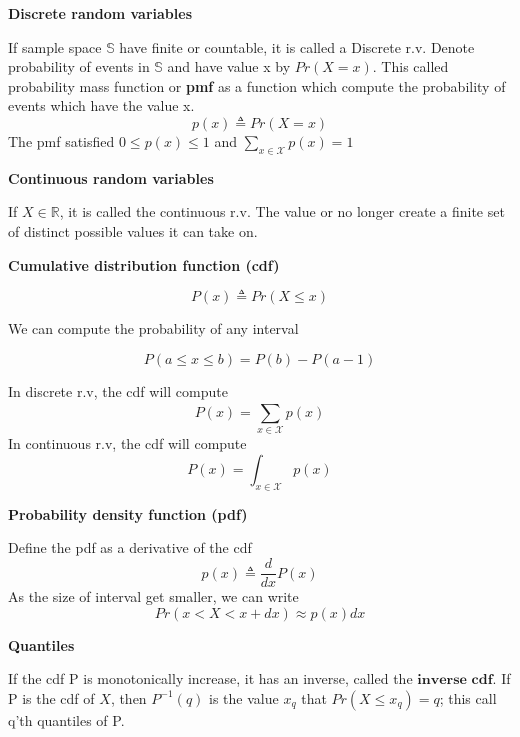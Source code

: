 \documentclass[10pt,landscape]{article}
\begin{document}
\begin{multicols*}{3}
    \textbf{Discrete random variables}
    
    If sample space $\mathbb{S}$ have finite or countable, it is called a Discrete r.v. Denote probability of events in $\mathbb{S}$ and have value x by $Pr(X=x)$. This called probability mass function or \textbf{pmf} as a function which compute the probability of events which have the value x.
    \begin{equation*}
        p(x)\triangleq Pr(X=x)
    \end{equation*}
    The pmf satisfied $0\leq p(x) \leq 1$ and $\sum_{x\in \mathcal{X}}^{}p(x)=1$
    
\textbf{Continuous random variables}

    If $X \in \mathbb{R}$, it is called the continuous r.v. The value or no longer create a finite set of distinct possible values it can take on.

\textbf{Cumulative distribution function (cdf)}

    \begin{equation*}
        P(x) \triangleq Pr(X\leq x)
    \end{equation*}

    We can compute the probability of any interval

    \begin{equation*}
        P(a\leq x \leq b) = P(b)-P(a-1)
    \end{equation*}

    In discrete r.v, the cdf will compute
    \begin{equation*}
        P(x)=\sum_{x\in \mathcal{X}}^{}p(x)
    \end{equation*}
    In continuous r.v, the cdf will compute
    \begin{equation*}
        P(x)=\int_{x\in \mathcal{X}}^{}p(x)
    \end{equation*}

\textbf{Probability density function (pdf)}

    Define the pdf as a derivative of the cdf
    \begin{equation*}
        p(x) \triangleq \frac{d}{dx}P(x)
    \end{equation*}
    As the size of interval get smaller, we can write
    \begin{equation*}
        Pr(x<X<x+dx) \approx p(x)dx
    \end{equation*}
    
\textbf{Quantiles}

    If the cdf P is monotonically increase, it has an inverse, called the $\textbf{inverse cdf}$. If P is the cdf of $X$, then $P^{-1}(q)$ is the value $x_q$ that $Pr(X\leq x_q)=q$; this call q'th quantiles of P.    


\end{multicols*}
\end{document}
